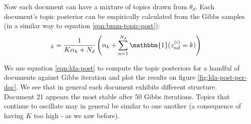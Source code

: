 \documentclass[]{article}
\begin{document}
Now each document can have a mixture of topics drawn from $\theta_d$. Each document's topic posterior can be empirically calculated from the Gibbs samples (in a similar way to equation \ref{eqn:bmm-topic-post}):
%
\begin{equation}
	[\theta^{(i)}_d]_k = \frac{1}{K\alpha_k + N_d} \left( \alpha_k +  \sum_{n=1}^{N_d} \mathbbm{1}(z^{(i)}_{nd} = k) \right)
	\label{eqn:lda-post}
\end{equation}

We use equation \ref{eqn:lda-post} to compute the topic posteriors for a handful of documents against Gibbs iteration and plot the results on figure \ref{fig:lda-post-per-doc}. We see that in general each document exhibits different structure. Document 21 appears the most stable after 50 Gibbs iterations. Topics that continue to oscillate may in general be similar to one another (a consequence of having $K$ too high - as we saw before).
%
\end{document}
